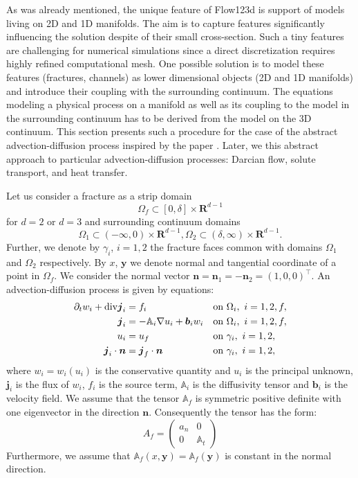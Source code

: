 \documentclass[12pt,a4paper]{report}
\def\prtl{\partial}
\def\vc#1{\mathbf{\boldsymbol{#1}}}     %
\def\tn#1{{\mathbb{#1}}}    %
\def\div{{\rm div}}
\def\grad{\nabla}
\def\Real{{\mathbf R}}
\begin{document}
As was already mentioned, the unique feature of Flow123d is support of models living on 2D and 1D manifolds. The aim is to capture 
features significantly influencing the solution despite of their small cross-section. Such a tiny features are
challenging for numerical simulations since a direct discretization requires highly refined
computational mesh. One possible solution is to model these features (fractures, channels) 
as lower dimensional objects (2D and 1D manifolds) and introduce their coupling with the surrounding continuum.
The equations modeling a physical process on a manifold as well as its coupling to the model in the surrounding continuum
has to be derived from the model on the 3D continuum. This section presents such a procedure for the case of the abstract
advection-diffusion process inspired by the paper \cite{martin_modeling_2005}. Later, we this abstract approach to 
particular advection-diffusion processes: Darcian flow, solute transport, and heat transfer.

Let us consider a fracture as a strip domain 
\[
 \Omega_f \subset [0,\delta] \times \Real^{d-1}
\]
for $d=2$ or $d=3$ and surrounding continuum domains
\[
 \Omega_1 \subset (-\infty,0)\times \Real^{d-1},
 \Omega_2 \subset (\delta,\infty)\times \Real^{d-1}.
\]
Further, we denote by $\gamma_i$, $i=1,2$ the fracture faces common with domains $\Omega_1$ and $\Omega_2$ respectively.
By $x$, $\vc y$ we denote normal and tangential coordinate of a point in $\Omega_f$. 
We consider the normal vector  $\vc n=\vc n_1=-\vc n_2=(1,0,0)^\top$.
An advection-diffusion process is given by equations:
\begin{align}
  \label{eq:fr:continuity}
  \prtl_t w_i + \div \vc j_i &= f_i&&  \text{on } \Omega_i,\ i=1,2,f,\\
  \label{eq:fr:flux}
  \vc j_i &= - \tn A_i\grad u_i + \vc b_i w_i&& \text{on } \Omega_i,\ i=1,2,f,\\
  \label{eq:fr:Dirichlet}
  u_i &= u_f&& \text{on } \gamma_i,\ i=1,2,\\
  \label{eq:fr:Neumann}
  \vc j_i \cdot \vc n &= \vc j_f \cdot \vc n&& \text{on } \gamma_i,\ i=1,2,
\end{align}
where $w_i=w_i(u_i)$ is the conservative quantity and $u_i$ is the principal unknown, $\vc j_i$ is the flux of $w_i$, $f_i$ is the source term,
$\tn A_i$ is the diffusivity tensor and $\vc b_i$ is the velocity field. We assume that the tensor $\tn A_f$ is symmetric positive definite 
with one eigenvector in the direction $\vc n$. Consequently the tensor has the form:
\[
 A_f = \begin{pmatrix} 
            a_n & 0  \\
            0 & \tn A_t
       \end{pmatrix}
\]
Furthermore, we assume that $\tn A_f(x, \vc y)=\tn A_f(\vc y)$ is constant in the normal direction.
\end{document}
